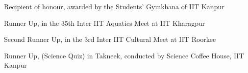 \vspace{3mm}
\small
\begin{cvitems}
  \item Recipient of honour, awarded by the Students' Gymkhana of IIT Kanpur
  \item Runner Up, in the 35th Inter IIT Aquatics Meet at IIT Kharagpur
  \item Second Runner Up,  in the 3rd Inter IIT Cultural Meet at IIT Roorkee
  \item Runner Up, (Science Quiz) in Takneek, conducted by Science Coffee House, IIT Kanpur
\end{cvitems}